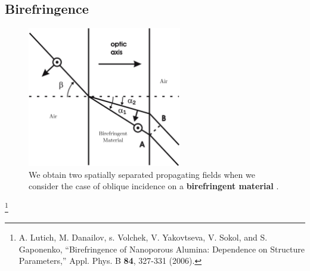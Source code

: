 \documentclass[aspectratio=169,t,xcolor=table]{beamer}
\newcommand\blfootnote[1]{%
  \begingroup
  \renewcommand\thefootnote{}\footnote[frame]{\tiny #1}%
  \addtocounter{footnote}{-1}%
  \endgroup
}
\begin{document}
        \subsection{Birefringence}
        \begin{frame}
            \vspace{-0.7em}
            \begin{figure}[H]
                \centering
                \includegraphics[width=0.6\textwidth]{figs/Birefringence.png}
                \vspace{-0.7em}
                \caption{
                    We obtain two spatially separated propagating fields when 
                    we consider
                    the case of oblique incidence on a \textbf{birefringent 
                    material} \cite{BR_IM}.
                }
                \label{fig:BR}
            \end{figure}\vspace{-2em}
            \blfootnote{
                \cite{BR_IM} A. Lutich, M. Danailov, s. Volchek, V. Yakovtseva, 
                V. Sokol, and S. Gaponenko, ``Birefringence of Nanoporous 
                Alumina: Dependence on
                Structure Parameters,'' Appl. Phys. B \textbf{84}, 327-331 (2006).
            }
        \end{frame}
\end{document}
